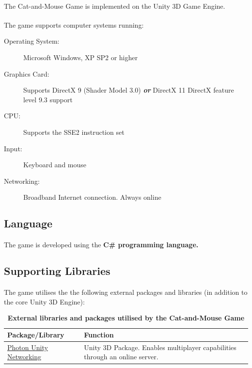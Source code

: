 \documentclass[12pt, titlepage]{article}
\begin{document}
\paragraph{}The Cat-and-Mouse Game is implemented on the Unity 3D Game Engine.
\paragraph{} The game supports computer systems running:
\begin{description}
    \item [Operating System:] Microsoft Windows, XP SP2 or higher
    \item [Graphics Card:] Supports DirectX 9 (Shader Model 3.0) 
    \textbf{\emph{or}} DirectX 11 DirectX feature level 9.3 support
    \item [CPU:] Supports the SSE2 instruction set
    \item [Input:] Keyboard and mouse
    \item [Networking:] Broadband Internet connection. Always online
\end{description}
\subsection{Language}
\paragraph{}The game is developed using the \textbf{C\# programming language.}
\subsection{Supporting Libraries}
\paragraph{}The game utilises the the following external packages and libraries (in addition to the core Unity 3D Engine):

\begin{table}[h]
\begin{tabularx}{\textwidth}{p{5cm}X}
    \toprule {\bf Package/Library} & {\bf Function}\\
    \midrule
    \href{https://www.photonengine.com/en/PUN}{Photon Unity Networking} & Unity 3D Package. Enables multiplayer capabilities through an online server.
    \bottomrule
\end{tabularx}
\caption{\textbf{External libraries and packages utilised by the Cat-and-Mouse Game}} \label{tab:libs}
\end{table}
\end{document}

